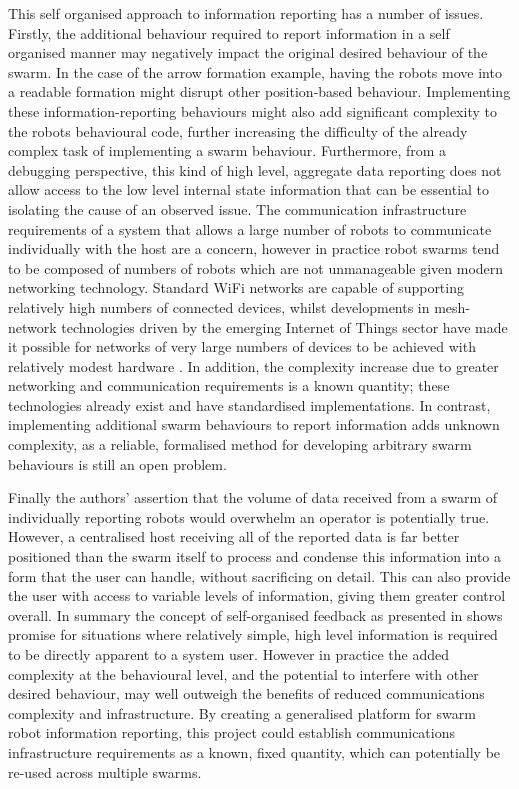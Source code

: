 This self organised approach to information reporting \cite{Podevijn:2012} has a number of issues. Firstly, the additional behaviour required to report information in a self organised manner may negatively impact the original desired behaviour of the swarm. In the case of the arrow formation example, having the robots move into a readable formation might disrupt other position-based behaviour. Implementing these information-reporting behaviours might also add significant complexity to the robots behavioural code, further increasing the difficulty of the already complex task of implementing a swarm behaviour. Furthermore, from a debugging perspective, this kind of high level, aggregate data reporting does not allow access to the low level internal state information that can be essential to isolating the cause of an observed issue. The communication infrastructure requirements of a system that allows a large number of robots to communicate individually with the host are a concern, however in practice robot swarms tend to be composed of numbers of robots which are not unmanageable given modern networking technology. Standard WiFi networks are capable of supporting relatively high numbers of connected devices, whilst developments in mesh-network technologies driven by the emerging Internet of Things sector have made it possible for networks of very large numbers of devices to be achieved with relatively modest hardware \cite{Nguyen:2012}. In addition, the complexity increase due to greater networking and communication requirements is a known quantity; these technologies already exist and have standardised implementations. In contrast, implementing additional swarm behaviours to report information adds unknown complexity, as a reliable, formalised method for developing arbitrary swarm behaviours is still an open problem.

Finally the authors' assertion that the volume of data received from a swarm of individually reporting robots would overwhelm an operator is potentially true. However, a centralised host receiving all of the reported data is far better positioned than the swarm itself to process and condense this information into a form that the user can handle, without sacrificing on detail. This can also provide the user with access to variable levels of information, giving them greater control overall. In summary the concept of self-organised feedback as presented in \cite{Podevijn:2012} shows promise for situations where relatively simple, high level information is required to be directly apparent to a system user. However in practice the added complexity at the behavioural level, and the potential to interfere with other desired behaviour, may well outweigh the benefits of reduced communications complexity and infrastructure. By creating a generalised platform for swarm robot information reporting, this project could establish communications infrastructure requirements as a known, fixed quantity, which can potentially be re-used across multiple swarms.

